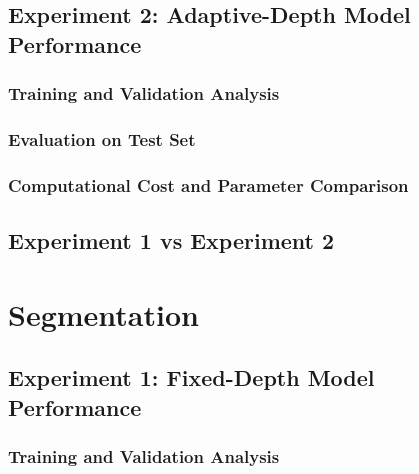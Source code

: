     \subsection{Experiment 2: Adaptive-Depth Model Performance}
        \subsubsection{Training and Validation Analysis}

        \subsubsection{Evaluation on Test Set}

        \subsubsection{Computational Cost and Parameter Comparison}

    \subsection{Experiment 1 vs Experiment 2}

\section{Segmentation}

    \subsection{Experiment 1: Fixed-Depth Model Performance}
        \subsubsection{Training and Validation Analysis}


